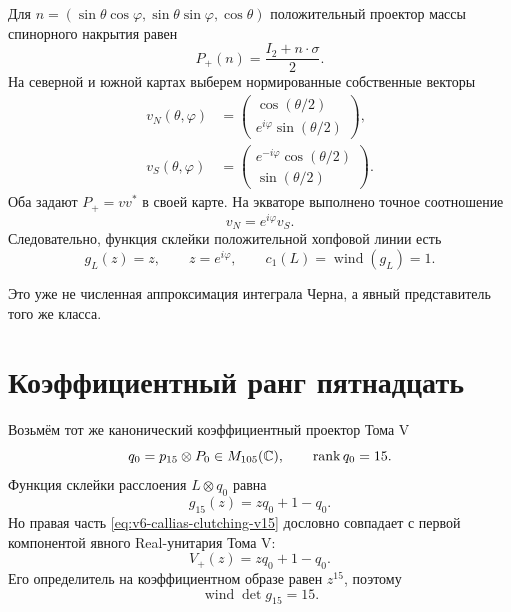 Для $n=(\sin\theta\cos\varphi,\sin\theta\sin\varphi,\cos\theta)$
положительный проектор массы спинорного накрытия равен
\begin{equation}
 P_+(n)=\frac{I_2+n\cdot\sigma}{2}.
\end{equation}
На северной и южной картах выберем нормированные собственные векторы
\begin{align}
 v_N(\theta,\varphi)
 &=\begin{pmatrix}\cos(\theta/2)\\
 e^{i\varphi}\sin(\theta/2)\end{pmatrix},\\
 v_S(\theta,\varphi)
 &=\begin{pmatrix}e^{-i\varphi}\cos(\theta/2)\\
 \sin(\theta/2)\end{pmatrix}.
\end{align}
Оба задают $P_+=vv^*$ в своей карте. На экваторе выполнено точное
соотношение
\begin{equation}
 v_N=e^{i\varphi}v_S.
 \label{eq:v6-hopf-clutching-z}
\end{equation}
Следовательно, функция склейки положительной хопфовой линии есть
\begin{equation}
 g_L(z)=z,
 \qquad z=e^{i\varphi},
 \qquad c_1(L)=\operatorname{wind}(g_L)=1.
\end{equation}

Это уже не численная аппроксимация интеграла Черна, а явный представитель
того же класса.

\section{Коэффициентный ранг пятнадцать}

Возьмём тот же канонический коэффициентный проектор Тома V
\begin{equation}
 q_0=p_{15}\otimes P_0\in M_{105}(\mathbb C),
 \qquad \operatorname{rank} q_0=15.
\end{equation}
Функция склейки расслоения $L\otimes q_0$ равна
\begin{equation}
 g_{15}(z)=zq_0+1-q_0.
 \label{eq:v6-callias-clutching-v15}
\end{equation}
Но правая часть \eqref{eq:v6-callias-clutching-v15} дословно совпадает с
первой компонентой явного Real-унитария Тома V:
\begin{equation}
 V_+(z)=zq_0+1-q_0.
\end{equation}
Его определитель на коэффициентном образе равен $z^{15}$, поэтому
\begin{equation}
 \operatorname{wind}\det g_{15}=15.
\end{equation}

